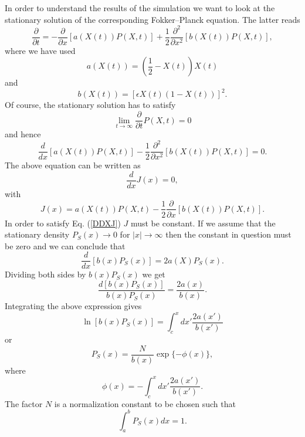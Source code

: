 In order to understand the results of the simulation  we want to 
look at the stationary solution of the corresponding 
Fokker--Planck equation. The latter reads
\begin{equation*}
\frac{\partial}{\partial t} = - \frac{\partial}{\partial x} [a(X(t)) P(X,t) ]
      + \frac{1}{2} \frac{\partial^2}{\partial 
      x^2}[b(X(t))P(X,t)],
\end{equation*}
where we have used
\begin{equation*}
a(X(t)) = \left(\frac{1}{2} - X(t)\right) X(t)
\end{equation*}
and
\begin{equation*}
b(X(t)) = [\epsilon X(t) (1-X(t))]^2.
\end{equation*}
Of course, the stationary solution has to satisfy
\begin{equation*}
\lim_{t \rightarrow \infty} \frac{\partial}{\partial t} P(X,t) =0
\end{equation*}
and hence
\begin{equation*}
\frac{d}{dx} [a(X(t)) P(X,t) ] - \frac{1}{2} \frac{\partial^2}{\partial 
      x^2}[b(X(t))P(X,t)] =0.
\end{equation*}
The above equation can be written as
\begin{equation}
\label{DDXJ}
\frac{d}{dx} J(x) =0,
\end{equation}
with 
\begin{equation*}
J(x) = a(X(t)) P(X,t)  - \frac{1}{2} \frac{\partial}{\partial 
      x}[b(X(t))P(X,t)].
\end{equation*}
In order to satisfy Eq. (\ref{DDXJ}) $J$ must be constant. If we 
assume that the stationary density $P_S(x) \longrightarrow 0$ for 
$|x| \longrightarrow \infty$ then the constant in question must be 
zero and we can conclude that
\begin{equation*}
\frac{d}{dx} [b(x) P_S(x)] = 2 a(X)P_S(x).
\end{equation*}
Dividing both sides by $b(x)P_S(x)$ we get
\begin{equation*}
\frac{d [b(x) P_S(x)]}{b(x) P_S(x)} = \frac{2a(x)}{b(x)}.
\end{equation*}
Integrating the above expression gives
\begin{equation*}
\ln [b(x) P_S(x)] = \int_c^x dx' \frac{2a(x')}{b(x')}
\end{equation*}
or
\begin{equation*}
P_S(x) = \frac{N}{b(x)} \exp\{-\phi (x)\},
\end{equation*}
where
\begin{equation*}
\phi(x) = - \int_c^x dx' \frac{2a(x')}{b(x')}.
\end{equation*}
The factor $N$ is a normalization constant to be chosen such that
\begin{equation*}
\int_a^b P_S(x) dx =1.
\end{equation*}

